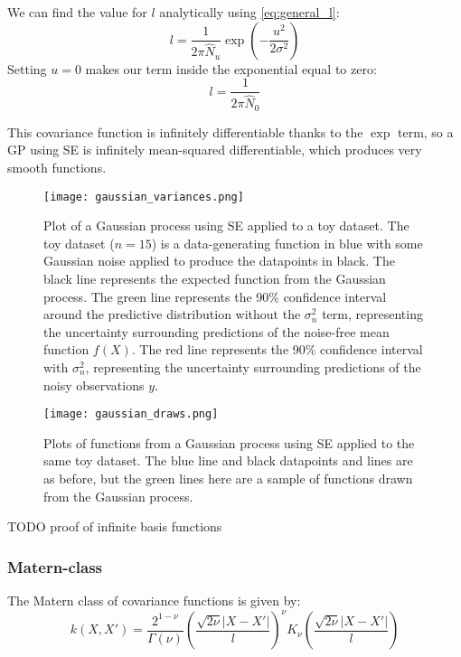 We can find the value for $l$ analytically using \ref{eq:general_l}:
\begin{equation*}
    l = \frac{1}{2\pi\hat{N}_u} \exp\left(-\frac{u^2}{2\sigma^2}\right)
\end{equation*}
Setting $u = 0$ makes our term inside the exponential equal to zero:
\begin{equation*}
    l = \frac{1}{2\pi\hat{N}_0}
\end{equation*}

This covariance function is infinitely differentiable thanks to the $\exp$ term, so a GP using SE is infinitely mean-squared differentiable, which produces very smooth functions.

\begin{figure}[h]
    \texttt{[image: gaussian\_variances.png]}
    \caption{
        Plot of a Gaussian process using SE applied to a toy dataset. The toy dataset ($n = 15$) is a data-generating function in blue with some Gaussian noise applied to produce the datapoints in black. The black line represents the expected function from the Gaussian process. The green line represents the 90\% confidence interval around the predictive distribution without the $\sigma^2_n$ term, representing the uncertainty surrounding predictions of the noise-free mean function $f(X)$. The red line represents the 90\% confidence interval with $\sigma^2_n$, representing the uncertainty surrounding predictions of the noisy observations $y$.
    }
\end{figure}

\begin{figure}[h]
    \texttt{[image: gaussian\_draws.png]}
    \caption{
        Plots of functions from a Gaussian process using SE applied to the same toy dataset. The blue line and black datapoints and lines are as before, but the green lines here are a sample of functions drawn from the Gaussian process.
    }
\end{figure}

TODO proof of infinite basis functions



\newpage
\subsubsection{Matern-class}
The Matern class of covariance functions is given by:
\begin{equation*}
    k(X,X') = \frac{2^{1 - \nu}}{\Gamma(\nu)}\left(\frac{\sqrt{2\nu}|X - X'|}{l}\right)^{\nu}K_{\nu}\left(\frac{\sqrt{2\nu}|X - X'|}{l}\right)
\end{equation*}

